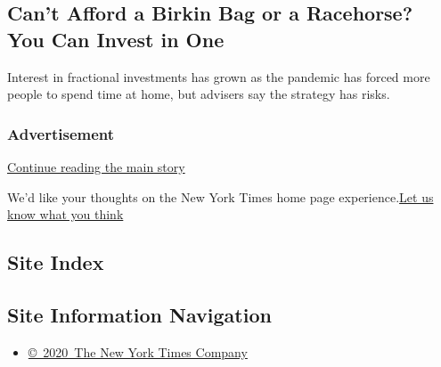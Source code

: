 \href{/2020/07/31/your-money/birkin-bag-racehorse-invest.html}{}

\hypertarget{cant-afford-a-birkin-bag-or-a-racehorse-you-can-invest-in-one}{%
\subsection{Can't Afford a Birkin Bag or a Racehorse? You Can Invest in
One}\label{cant-afford-a-birkin-bag-or-a-racehorse-you-can-invest-in-one}}

Interest in fractional investments has grown as the pandemic has forced
more people to spend time at home, but advisers say the strategy has
risks.

\href{/2020/07/31/your-money/birkin-bag-racehorse-invest.html}{}

\hypertarget{advertisement}{%
\subsubsection{Advertisement}\label{advertisement}}

\protect\hyperlink{after-dfp-ad-mid1-large}{Continue reading the main
story}

We'd like your thoughts on the New York Times home page
experience.\href{http://nyt.qualtrics.com/jfe/form/SV_eFJmKj9v0krSE0l}{Let
us know what you think}

\hypertarget{site-index}{%
\subsection{Site Index}\label{site-index}}

\hypertarget{site-information-navigation}{%
\subsection{Site Information
Navigation}\label{site-information-navigation}}

\begin{itemize}
\tightlist
\item
  \href{https://help.nytimes.com/hc/en-us/articles/115014792127-Copyright-notice}{©~2020~The
  New York Times Company}
\end{itemize}

